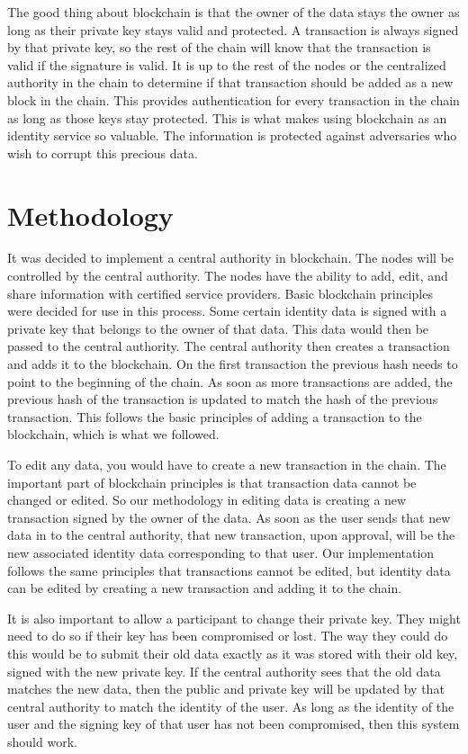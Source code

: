 \documentclass[letterpaper, 10 pt, conference]{ieeeconf}  %
\begin{document}
The good thing about blockchain is that the owner of the data stays the owner as long as their private key stays valid and protected. A transaction is always signed by that private key, so the rest of the chain will know that the transaction is valid if the signature is valid. It is up to the rest of the nodes or the centralized authority in the chain to determine if that transaction should be added as a new block in the chain. This provides authentication for every transaction in the chain as long as those keys stay protected. This is what makes using blockchain as an identity service so valuable. The information is protected against adversaries who wish to corrupt this precious data.

\section{Methodology}

It was decided to implement a central authority in blockchain. The nodes will be controlled by the central authority. The nodes have the ability to add, edit, and share information with certified service providers. Basic blockchain principles were decided for use in this process. Some certain identity data is signed with a private key that belongs to the owner of that data. This data would then be passed to the central authority. The central authority then creates a transaction and adds it to the blockchain. On the first transaction the previous hash needs to point to the beginning of the chain. As soon as more transactions are added, the previous hash of the transaction is updated to match the hash of the previous transaction. This follows the basic principles of adding a transaction to the blockchain, which is what we followed.

To edit any data, you would have to create a new transaction in the chain. The important part of blockchain principles is that transaction data cannot be changed or edited. So our methodology in editing data is creating a new transaction signed by the owner of the data. As soon as the user sends that new data in to the central authority, that new transaction, upon approval, will be the new associated identity data corresponding to that user. Our implementation follows the same principles that transactions cannot be edited, but identity data can be edited by creating a new transaction and adding it to the chain.

It is also important to allow a participant to change their private key. They might need to do so if their key has been compromised or lost. The way they could do this would be to submit their old data exactly as it was stored with their old key, signed with the new private key. If the central authority sees that the old data matches the new data, then the public and private key will be updated by that central authority to match the identity of the user. As long as the identity of the user and the signing key of that user has not been compromised, then this system should work. 
\end{document}
